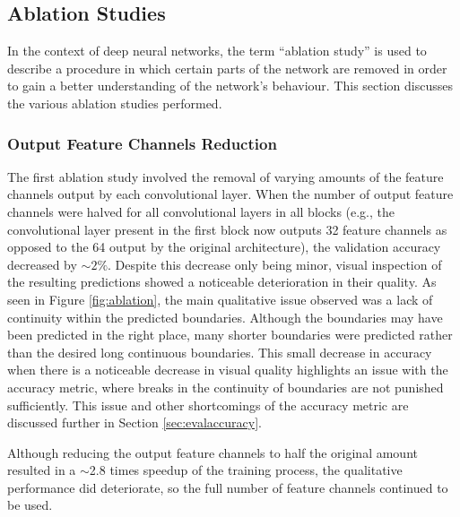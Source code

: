 \subsection{Ablation Studies}
\label{sec:evalablation}

In the context of deep neural networks, the term “ablation study” is used to describe a procedure in which certain parts of the network are removed in order to gain a better understanding of the network's behaviour. This section discusses the various ablation studies performed.

\subsubsection{Output Feature Channels Reduction}

The first ablation study involved the removal of varying amounts of the feature channels output by each convolutional layer. When the number of output feature channels were halved for all convolutional layers in all blocks (e.g., the convolutional layer present in the first block now outputs 32 feature channels as opposed to the 64 output by the original architecture), the validation accuracy decreased by ${\sim}2\%$. Despite this decrease only being minor, visual inspection of the resulting predictions showed a noticeable deterioration in their quality. As seen in Figure \ref{fig:ablation}, the main qualitative issue observed was a lack of continuity within the predicted boundaries. Although the boundaries may have been predicted in the right place, many shorter boundaries were predicted rather than the desired long continuous boundaries. This small decrease in accuracy when there is a noticeable decrease in visual quality highlights an issue with the accuracy metric, where breaks in the continuity of boundaries are not punished sufficiently. This issue and other shortcomings of the accuracy metric are discussed further in Section \ref{sec:evalaccuracy}.

Although reducing the output feature channels to half the original amount resulted in a ${\sim}$2.8 times speedup of the training process, the qualitative performance did deteriorate, so the full number of feature channels continued to be used.

